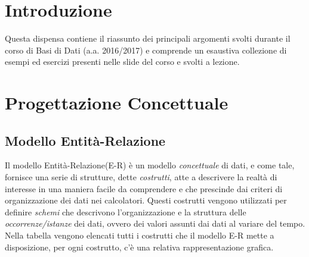 \documentclass[a4paper, 10pt]{article}
\theoremstyle{definition}
\begin{document}
	\begin{frontespizio}
		\Scuola{}
		\Titoletto{}
	\end{frontespizio}
	\tableofcontents
	
	\newpage
	
	\section{Introduzione}
		Questa dispensa contiene il riassunto dei principali argomenti svolti durante il corso di Basi di Dati (a.a. 2016/2017) e comprende un esaustiva collezione di esempi ed esercizi presenti nelle slide del corso e svolti a lezione.
	
	\section{Progettazione Concettuale}
		\subsection{Modello Entità-Relazione}
		Il modello Entità-Relazione(E-R) è un modello \textit{concettuale} di dati, e come tale, fornisce una serie di strutture, dette \textit{costrutti}, atte a descrivere la realtà di interesse in una maniera facile da comprendere e che prescinde dai criteri di organizzazione dei dati nei calcolatori.
		Questi costrutti vengono utilizzati per definire \textit{schemi} che descrivono l'organizzazione e la struttura delle \textit{occorrenze/istanze} dei dati, ovvero dei valori assunti dai dati al variare del tempo. Nella tabella vengono elencati tutti i costrutti che il modello E-R mette a disposizione, per ogni costrutto, c'è una relativa rappresentazione grafica.
\end{document}
